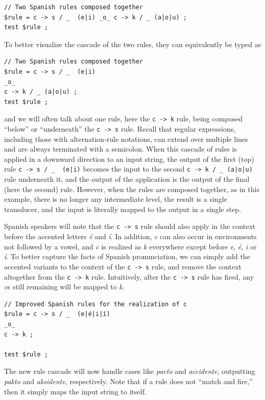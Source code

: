 \begin{Verbatim}
// Two Spanish rules composed together
$rule = c -> s / _  (e|i) _o_ c -> k / _ (a|o|u) ;
test $rule ;
\end{Verbatim}

To better visualize the cascade of the two rules, they can equivalently be typed as

\begin{Verbatim}
// Two Spanish rules composed together
$rule = c -> s / _  (e|i) 
_o_ 
c -> k / _ (a|o|u) ;
test $rule ;
\end{Verbatim}

\noindent
and we will often talk about one rule, here the \texttt{c -> k} rule,
being composed ``below'' or
``underneath'' the \texttt{c -> s} rule.  Recall that regular
expressions, including those with alternation-rule notations, can extend
over multiple lines and are always terminated with a semicolon.  When this cascade of rules is applied in a downward direction to an input
string, the output of the first (top) rule \verb!c -> s / _  (e|i)!
becomes the input to the second \verb!c -> k / _ (a|o|u)! rule
underneath it, and the output of the application is the output of the
final (here the second) rule.  However, when the rules are composed
together, as in this example, there is no longer any intermediate level,
the result is a single transducer, and the input is literally mapped to the output
in a single step.

Spanish speakers will note that the \texttt{c -> s} rule should also apply in the context
before the accented letters
\emph{é} and \emph{í}.  In addition, \emph{c} can also occur in environments not followed by a vowel,
and \emph{c} is realized as \emph{k} everywhere except before \emph{e}, \emph{é}, \emph{i} or \emph{í}.
To better capture the facts of Spanish pronunciation, 
we can simply add the accented variants to the context of the \texttt{c -> s}
rule, and remove the context altogether from the \texttt{c -> k} rule.  Intuitively, after the \texttt{c -> s}
rule has fired, any \emph{c}s still remaining will be mapped to \emph{k}.

\begin{Verbatim}
// Improved Spanish rules for the realization of c
$rule = c -> s / _  (e|é|i|í)
_o_
c -> k ;

test $rule ;
\end{Verbatim}

\noindent
The new rule cascade will now handle cases like \emph{pacto} and \emph{accidente},
outputting \emph{pakto} and \emph{aksidente}, respectively.  Note that if a rule does not ``match and fire,'' then it simply maps the input string to itself.  

